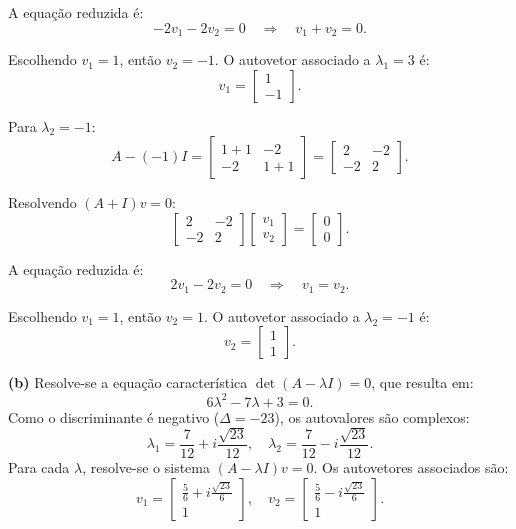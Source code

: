 \begin{resolution}
  A equação reduzida é:
  \[
    -2v_1 - 2v_2 = 0 \quad \Rightarrow \quad v_1 + v_2 = 0.
  \]

  Escolhendo \(v_1 = 1\), então \(v_2 = -1\). O autovetor associado a \(\lambda_1 = 3\) é:
  \[
    v_1 = \begin{bmatrix}
      1 \\ -1
    \end{bmatrix}.
  \]

  Para \(\lambda_2 = -1\):
  \[
    A - (-1)I = \begin{bmatrix}
      1 + 1 & -2    \\
      -2    & 1 + 1
    \end{bmatrix}
    = \begin{bmatrix}
      2  & -2 \\
      -2 & 2
    \end{bmatrix}.
  \]

  Resolvendo \((A + I)v = 0\):
  \[
    \begin{bmatrix}
      2  & -2 \\
      -2 & 2
    \end{bmatrix}
    \begin{bmatrix}
      v_1 \\ v_2
    \end{bmatrix}
    = \begin{bmatrix}
      0 \\ 0
    \end{bmatrix}.
  \]

  A equação reduzida é:
  \[
    2v_1 - 2v_2 = 0 \quad \Rightarrow \quad v_1 = v_2.
  \]

  Escolhendo \(v_1 = 1\), então \(v_2 = 1\). O autovetor associado a \(\lambda_2 = -1\) é:
  \[
    v_2 = \begin{bmatrix}
      1 \\ 1
    \end{bmatrix}.
  \]

  {\bf (b)} \;
  Resolve-se a equação característica \( \det(A - \lambda I) = 0 \), que resulta em:
  \[
    6\lambda^2 - 7\lambda + 3 = 0.
  \]
  Como o discriminante é negativo (\(\Delta = -23\)), os autovalores são complexos:
  \[
    \lambda_1 = \frac{7}{12} + i\frac{\sqrt{23}}{12}, \quad \lambda_2 = \frac{7}{12} - i\frac{\sqrt{23}}{12}.
  \]
  Para cada \(\lambda\), resolve-se o sistema \((A - \lambda I)v = 0\). Os autovetores associados são:
  \[
    v_1 = \begin{bmatrix} \frac{5}{6} + i\frac{\sqrt{23}}{6} \\ 1\end{bmatrix}, \quad
    v_2 = \begin{bmatrix} \frac{5}{6} - i\frac{\sqrt{23}}{6} \\ 1 \end{bmatrix}.
  \]


\end{resolution}
